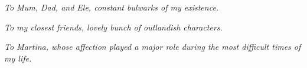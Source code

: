 \newpage \vspace*{8cm}
\thispagestyle{empty}

\begin{flushright}
   \emph{To Mum, Dad, and Ele, constant bulwarks of my existence.}
\end{flushright}

\begin{flushright}
   \emph{To my closest friends, lovely bunch of outlandish characters.}
\end{flushright}

\begin{flushright}
   \emph{To Martina, whose affection played a major role during the most difficult times of my life.}
\end{flushright}

